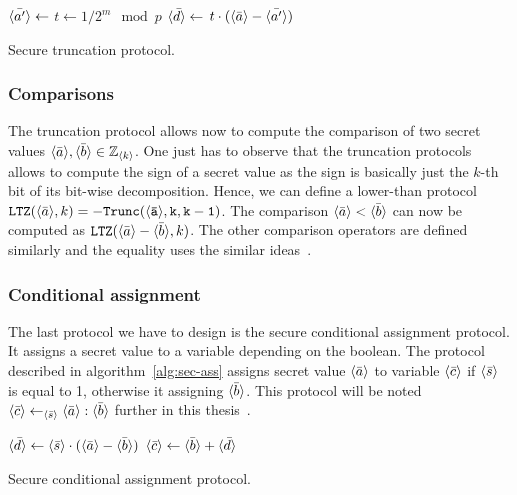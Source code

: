 \begin{center}
\begin{algorithm}[H]
\DontPrintSemicolon
{}
$\langle \bar{a'} \rangle \leftarrow$  \;
$t \leftarrow 1/2^m \mod p$ \;
$\langle \bar{d} \rangle \leftarrow$ $t \cdot (\langle \bar{a} \rangle-\langle \bar{a'} \rangle)$ \;
\caption{Secure truncation protocol.}
\label{alg:trunc}
\end{algorithm}
\end{center}

\subsubsection{Comparisons}
The truncation protocol allows now to compute the comparison of two secret values $\langle \bar{a} \rangle, \langle \bar{b} \rangle \in \mathbb{Z}_{\langle k \rangle}$. One just has to observe that the truncation protocols allows to compute the sign of a secret value as the sign is basically just the $k$-th bit of its bit-wise decomposition. Hence, we can define a lower-than protocol $\mathtt{LTZ}(\langle \bar{a} \rangle,k) = -\mathtt{Trunc(\langle \bar{a} \rangle,k,k-1)}$. The comparison $\langle \bar{a} \rangle<\langle \bar{b} \rangle$ can now be computed as $\mathtt{LTZ}(\langle \bar{a} \rangle-\langle \bar{b} \rangle,k)$. The other comparison operators are defined similarly and the equality uses the similar ideas~\cite{Aly2018SCALEDocumentation,Catrina2010ImprovedComputation}.

\subsubsection{Conditional assignment}
The last protocol we have to design is the secure conditional assignment protocol. It assigns a secret value to a variable depending on the boolean. The protocol described in algorithm~\ref{alg:sec-ass} assigns secret value $\langle \bar{a} \rangle$ to variable $\langle \bar{c} \rangle$ if $\langle \bar{s} \rangle$ is equal to 1, otherwise it assigning $\langle \bar{b} \rangle$. This protocol will be noted $\langle \bar{c} \rangle \leftarrow_{\langle \bar{s} \rangle} \langle \bar{a} \rangle : \langle \bar{b} \rangle$ further in this thesis~\cite{Aly2014SecurelyProblems}.

\begin{center}
\begin{algorithm}[H]
\DontPrintSemicolon
$\langle \bar{d} \rangle \leftarrow \langle \bar{s} \rangle \cdot (\langle \bar{a} \rangle - \langle \bar{b} \rangle)$ \;
$\langle \bar{c} \rangle \leftarrow \langle \bar{b} \rangle + \langle \bar{d} \rangle$ \;
\caption{Secure conditional assignment protocol.}
\label{alg:sec-ass}
\end{algorithm}
\end{center}

